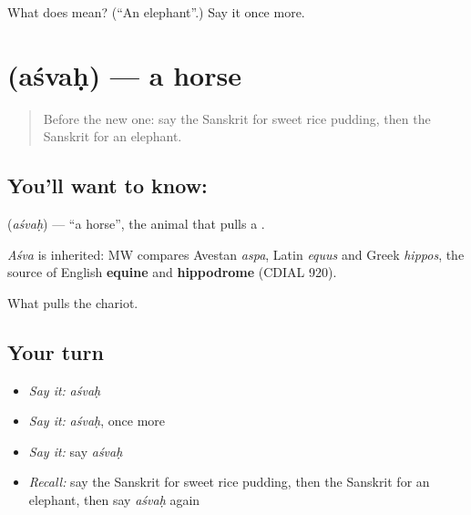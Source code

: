 \begin{tcolorbox}[breakable,colback=teal!4,colframe=teal!35!black,title={Before you move on}]
What does  mean? (\textquotedblleft{}An elephant\textquotedblright{}.) Say it once more.
\end{tcolorbox}
\section[\texorpdfstring{\sk{अश्वः} (aśvaḥ)}{अश्वः (aśvaḥ)}]{ (aśvaḥ) — a horse}

\label{lesson:SA-C79-horse}



\begin{quote}
Before the new one: say the Sanskrit for sweet rice pudding, then the Sanskrit for an elephant.
\end{quote}

\subsection*{You'll want to know: }
\textbf{} (\emph{aśvaḥ}) — \textquotedblleft{}a horse\textquotedblright{}, the animal that pulls a \textbf{}.

\begin{cousinweb}
\emph{Aśva} is inherited: MW compares Avestan \emph{aspa}, Latin \emph{equus} and Greek \emph{hippos}, the source of English \textbf{equine} and \textbf{hippodrome} (CDIAL 920).
\end{cousinweb}

\begin{grammarlens}[title={What you've built}]
What pulls the chariot.
\end{grammarlens}

\subsection*{Your turn}
\begin{itemize}
\raggedright
  \item \emph{Say it:} \emph{aśvaḥ}
  \item \emph{Say it:} \emph{aśvaḥ}, once more
  \item \emph{Say it:} say \emph{aśvaḥ}
  \item \emph{Recall:} say the Sanskrit for sweet rice pudding, then the Sanskrit for an elephant, then say \emph{aśvaḥ} again
\end{itemize}

